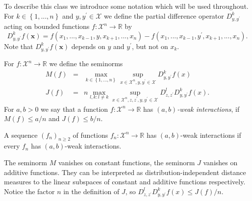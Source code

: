 \documentclass[final,12pt]{colt2018} %
\begin{document}
To describe this class we introduce some notation which will be used
throughout. For $k\in \left\{ 1,...,n\right\} $ and $y,y^{\prime }\in 
\mathcal{X}$ we define the partial difference operator $D_{y,y^{\prime
	}}^{k} $ acting on bounded functions $f:\mathcal{X}^{n}\rightarrow 
	\mathbb{R}
	$ by 
	\begin{equation*}
	D_{y,y^{\prime }}^{k}f\left( \mathbf{x}\right) =f\left(
	x_{1},...,x_{k-1},y,x_{k+1},...,x_{n}\right) -f\left(
	x_{1},...,x_{k-1},y^{\prime },x_{k+1},...,x_{n}\right) \text{.} 
	\end{equation*}%
	Note that $D_{y,y^{\prime }}^{k}f\left( \mathbf{x}\right) $ depends on $y$
	and $y^{\prime }$, but not on $x_{k}$.%
	
	\begin{definition}
		For $f:\mathcal{X}^{n}\rightarrow 
		\mathbb{R}
		$ we define the seminorms%
		\begin{eqnarray*}
			M\left( f\right) &=&\max_{k\in \left\{ 1,...,n\right\} }\sup_{x\in \mathcal{X%
				}^{n},y,y^{\prime }\in \mathcal{X}}D_{y,y^{\prime }}^{k}f\left( x\right) \\
			J\left( f\right) &=&n\max_{l,k:l\neq k}\sup_{x\in \mathcal{X}%
				^{n},z,z^{\prime },y,y^{\prime }\in \mathcal{X}}D_{z,z^{\prime
				}}^{l}D_{y,y^{\prime }}^{k}f\left( x\right) .
			\end{eqnarray*}%
			For $a,b>0$ we say that a function $f:\mathcal{X}^{n}\rightarrow 
			\mathbb{R}
			$ has $\left( a,b\right) $\textit{-weak interactions}, if $M\left( f\right)
			\leq a/n$ and $J\left( f\right) \leq b/n$.
			
			A sequence $\left( f_{n}\right) _{n\geq 2}$ of functions $f_{n}:\mathcal{X}%
			^{n}\rightarrow 
			\mathbb{R}
			$ has $\left( a,b\right) $-weak interactions if every $f_{n}$ has $\left(
			a,b\right) $-weak interactions.%
		\end{definition}
		
		The seminorm $M$ vanishes on constant functions, the seminorm $J$ vanishes
		on additive functions. They can be interpreted as distribution-independent
		distance measures to the linear subspaces of constant and additive functions
		respectively. Notice the factor $n$ in the definition of $J$, so $%
		D_{z,z^{\prime }}^{l}D_{y,y^{\prime }}^{k}f\left( x\right) \leq J\left(
		f\right) /n$.
		
\end{document}
